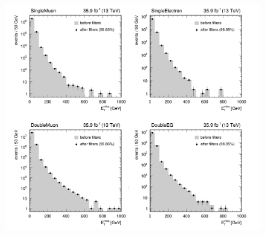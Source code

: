 \begin{figure}
\centering
\includegraphics[scale= 0.8]{../Cap4/met}
\caption{
}
\label{met}
\end{figure}

